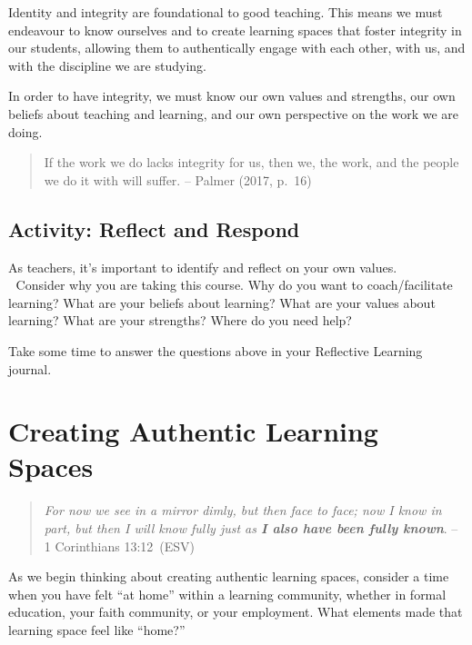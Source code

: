 \documentclass[
]{book}
\begin{document}
Identity and integrity are foundational to good teaching. This means we must endeavour to know ourselves and to create learning spaces that foster integrity in our students, allowing them to authentically engage with each other, with us, and with the discipline we are studying.

In order to have integrity, we must know our own values and strengths, our own beliefs about teaching and learning, and our own perspective on the work we are doing.

\begin{quote}
If the work we do lacks integrity for us, then we, the work, and the people we do it with will suffer. -- Palmer (2017, p.~16)
\end{quote}

\hypertarget{activity-reflect-and-respond}{%
\subsection{Activity: Reflect and Respond}\label{activity-reflect-and-respond}}

\begin{reflect}
As teachers, it's important to identify and reflect on your own
values.\\
💭 Consider why you are taking this course. Why do you want to
coach/facilitate learning? What are your beliefs about learning? What
are your values about learning? What are your strengths? Where do you
need help?

Take some time to answer the questions above in your Reflective Learning
journal.
\end{reflect}

\hypertarget{creating-authentic-learning-spaces}{%
\section{Creating Authentic Learning Spaces}\label{creating-authentic-learning-spaces}}

\begin{quote}
\emph{For now we see in a mirror dimly, but then face to face; now I know in part, but then I will know fully just as \textbf{I also have been fully known}}. -- 1 Corinthians 13:12~(ESV)
\end{quote}

As we begin thinking about creating authentic learning spaces, consider a time when you have felt ``at home'' within a learning community, whether in formal education, your faith community, or your employment. What elements made that learning space feel like ``home?''
\end{document}
